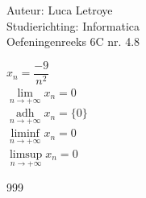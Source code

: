 \documentclass[a4paper]{article}
\begin{document}
  
\noindent \large Auteur: Luca Letroye \\
\noindent \large Studierichting: Informatica\\
\noindent \large Oefeningenreeks 6C nr. 4.8

\medskip
\normalsize

$x_n = \dfrac{-9}{n^2}$\\

$\lim\limits_{n \rightarrow +\infty} x_n = 0$\\

$\operatorname*{adh}\limits_{n \rightarrow +\infty} x_n = \{0\}$\\

$\liminf\limits_{n \rightarrow +\infty} x_n = 0$\\

$\limsup\limits_{n \rightarrow +\infty} x_n = 0$\\






\begin{thebibliography}{999}
\end{thebibliography}
\end{document}
